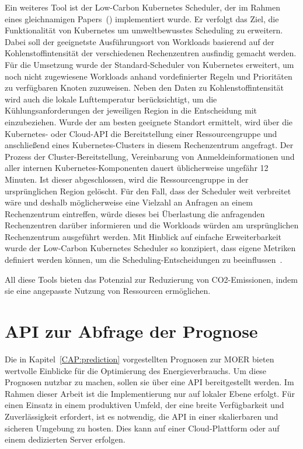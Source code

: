 Ein weiteres Tool ist der Low-Carbon Kubernetes Scheduler, der im Rahmen eines gleichnamigen Papers~(\cite{James.}) implementiert wurde.
Er verfolgt das Ziel, die Funktionalität von Kubernetes um umweltbewusstes Scheduling zu erweitern.
Dabei soll der geeignetste Ausführungsort von Workloads basierend auf der Kohlenstoffintensität der verschiedenen Rechenzentren ausfindig gemacht werden.
Für die Umsetzung wurde der Standard-Scheduler von Kubernetes erweitert, um noch nicht zugewiesene Workloads anhand vordefinierter Regeln und Prioritäten zu verfügbaren Knoten zuzuweisen.
Neben den Daten zu Kohlenstoffintensität wird auch die lokale Lufttemperatur berücksichtigt, um die Kühlungsanforderungen der jeweiligen Region in die Entscheidung mit einzubeziehen.
Wurde der am besten geeignete Standort ermittelt, wird über die Kubernetes- oder Cloud-\ac{API} die Bereitstellung einer Ressourcengruppe und anschließend eines Kubernetes-Clusters in diesem Rechenzentrum angefragt.
Der Prozess der Cluster-Bereitstellung, Vereinbarung von Anmeldeinformationen und aller internen Kubernetes-Komponenten dauert üblicherweise ungefähr 12 Minuten.
Ist dieser abgeschlossen, wird die Ressourcengruppe in der ursprünglichen Region gelöscht.
Für den Fall, dass der Scheduler weit verbreitet wäre und deshalb möglicherweise eine Vielzahl an Anfragen an einem Rechenzentrum eintreffen, würde dieses bei Überlastung die anfragenden Rechenzentren darüber informieren und die Workloads würden am ursprünglichen Rechenzentrum ausgeführt werden.
Mit Hinblick auf einfache Erweiterbarkeit wurde der Low-Carbon Kubernetes Scheduler so konzipiert, dass eigene Metriken definiert werden können, um die Scheduling-Entscheidungen zu beeinflussen~\cite{James.}.

All diese Tools bieten das Potenzial zur Reduzierung von CO2-Emissionen, indem sie eine angepasste Nutzung von Ressourcen ermöglichen.

\section{API zur Abfrage der Prognose}
Die in Kapitel~\ref{CAP:prediction} vorgestellten Prognosen zur \ac{MOER} bieten wertvolle Einblicke für die Optimierung des Energieverbrauchs.
Um diese Prognosen nutzbar zu machen, sollen sie über eine \ac{API} bereitgestellt werden.
Im Rahmen dieser Arbeit ist die Implementierung nur auf lokaler Ebene erfolgt.
Für einen Einsatz in einem produktiven Umfeld, der eine breite Verfügbarkeit und Zuverlässigkeit erfordert, ist es notwendig, die \ac{API} in einer skalierbaren und sicheren Umgebung zu hosten.
Dies kann auf einer Cloud-Plattform oder auf einem dedizierten Server erfolgen.

